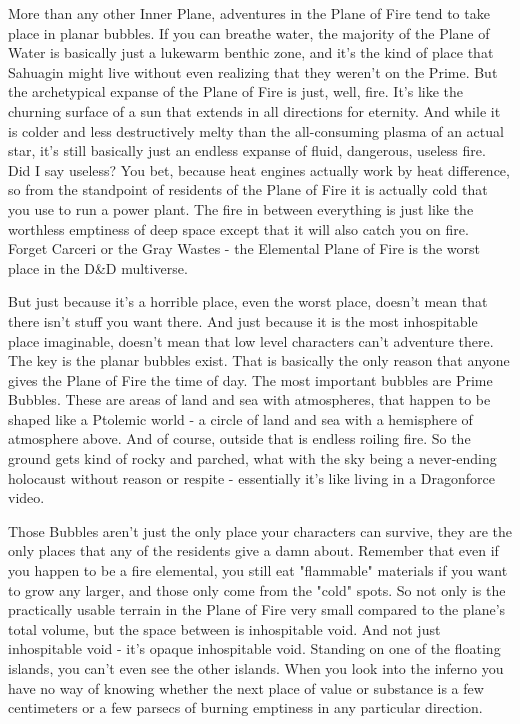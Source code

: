 More than any other Inner Plane, adventures in the Plane of Fire tend to take place in planar bubbles. If you can breathe water, the majority of the Plane of Water is basically just a lukewarm benthic zone, and it's the kind of place that Sahuagin might live without even realizing that they weren't on the Prime. But the archetypical expanse of the Plane of Fire is just, well, fire. It's like the churning surface of a sun that extends in all directions for eternity. And while it is colder and less destructively melty than the all-consuming plasma of an actual star, it's still basically just an endless expanse of fluid, dangerous, useless fire. Did I say useless? You bet, because heat engines actually work by heat difference, so from the standpoint of residents of the Plane of Fire it is actually cold that you use to run a power plant. The fire in between everything is just like the worthless emptiness of deep space except that it will also catch you on fire. Forget Carceri or the Gray Wastes - the Elemental Plane of Fire is the worst place in the D\&D multiverse.

But just because it's a horrible place, even the worst place, doesn't mean that there isn't stuff you want there. And just because it is the most inhospitable place imaginable, doesn't mean that low level characters can't adventure there. The key is the planar bubbles exist. That is basically the only reason that anyone gives the Plane of Fire the time of day. The most important bubbles are Prime Bubbles. These are areas of land and sea with atmospheres, that happen to be shaped like a Ptolemic world - a circle of land and sea with a hemisphere of atmosphere above. And of course, outside that is endless roiling fire. So the ground gets kind of rocky and parched, what with the sky being a never-ending holocaust without reason or respite - essentially it's like living in a Dragonforce video.

Those Bubbles aren't just the only place your characters can survive, they are the only places that any of the residents give a damn about. Remember that even if you happen to be a fire elemental, you still eat "flammable" materials if you want to grow any larger, and those only come from the "cold" spots. So not only is the practically usable terrain in the Plane of Fire very small compared to the plane's total volume, but the space between is inhospitable void. And not just inhospitable void - it's opaque inhospitable void. Standing on one of the floating islands, you can't even see the other islands. When you look into the inferno you have no way of knowing whether the next place of value or substance is a few centimeters or a few parsecs of burning emptiness in any particular direction.

